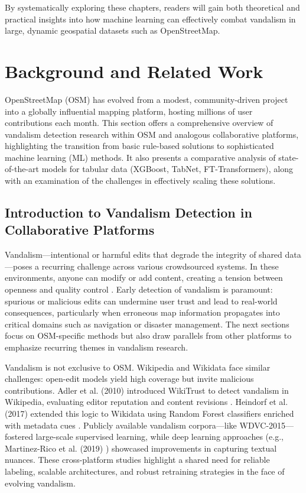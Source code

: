 \documentclass[
    13pt, %
    a4paper, %
    twoside, 
    DIV14, %
    listof=totoc, %
    bibliography=totoc, %
    index=totoc, %
    headsepline
]{scrreprt}
\begin{document}
By systematically exploring these chapters, readers will gain both theoretical and practical insights into how machine learning can effectively combat vandalism in large, dynamic geospatial datasets such as OpenStreetMap.


\chapter{Background and Related Work}\label{background}

OpenStreetMap (OSM) has evolved from a modest, community-driven project into a globally influential mapping platform, hosting millions of user contributions each month. This section offers a comprehensive overview of vandalism detection research within OSM and analogous collaborative platforms, highlighting the transition from basic rule-based solutions to sophisticated machine learning (ML) methods. It also presents a comparative analysis of state-of-the-art models for tabular data (XGBoost, TabNet, FT-Transformers), along with an examination of the challenges in effectively scaling these solutions.

\section{Introduction to Vandalism Detection in Collaborative Platforms}

Vandalism—intentional or harmful edits that degrade the integrity of shared data—poses a recurring challenge across various crowdsourced systems. In these environments, anyone can modify or add content, creating a tension between openness and quality control \cite{Adler2010, Heindorf2017, MartinezRico2019}. Early detection of vandalism is paramount: spurious or malicious edits can undermine user trust and lead to real-world consequences, particularly when erroneous map information propagates into critical domains such as navigation or disaster management. The next sections focus on OSM-specific methods but also draw parallels from other platforms to emphasize recurring themes in vandalism research.

Vandalism is not exclusive to OSM. Wikipedia and Wikidata face similar challenges: open-edit models yield high coverage but invite malicious contributions. Adler et al. (2010) introduced WikiTrust to detect vandalism in Wikipedia, evaluating editor reputation and content revisions \cite{Adler2010}. Heindorf et al. (2017) extended this logic to Wikidata using Random Forest classifiers enriched with metadata cues \cite{Heindorf2017}. Publicly available vandalism corpora—like WDVC-2015—fostered large-scale supervised learning, while deep learning approaches (e.g., Martinez-Rico et al. (2019) \cite{MartinezRico2019}) showcased improvements in capturing textual nuances. These cross-platform studies highlight a shared need for reliable labeling, scalable architectures, and robust retraining strategies in the face of evolving vandalism.
\end{document}
